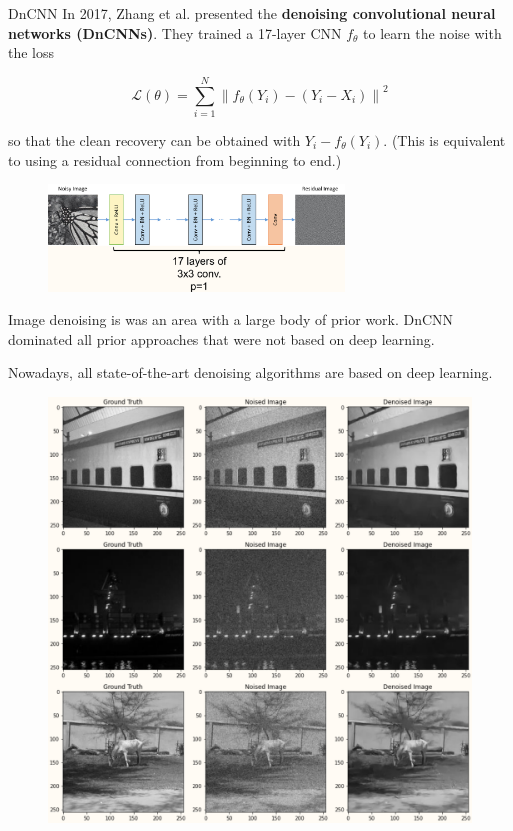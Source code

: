 \begin{frame}[allowframebreaks]

\begin{mydefinitionblock}{8.4}{DnCNN}
    In 2017, Zhang et al. presented the \textbf{denoising convolutional neural networks (DnCNNs)}. They trained a 17-layer CNN $f_{\theta}$ to learn the noise with the loss

    $$
    \mathcal{L}(\theta)=\sum_{i=1}^{N}\left\|f_{\theta}\left(Y_{i}\right)-\left(Y_{i}-X_{i}\right)\right\|^{2}
    $$

    so that the clean recovery can be obtained with $Y_{i}-f_{\theta}\left(Y_{i}\right)$. (This is equivalent to using a residual connection from beginning to end.)

    \begin{figure}[H]
        \centering
        \includegraphics[width=0.7\textwidth]{.././assets/8.1.png}
    \end{figure}

    \par\noindent\textcolor{gray}{\hdashrule{\textwidth}{0.4pt}{1pt 2pt}}

    Image denoising is was an area with a large body of prior work. DnCNN dominated all prior approaches that were not based on deep learning.

    Nowadays, all state-of-the-art denoising algorithms are based on deep learning.

    \begin{figure}[H]
        \centering
        \includegraphics[width=1.0\textwidth]{.././assets/8.2.png}
    \end{figure}


\end{mydefinitionblock}
\end{frame}
